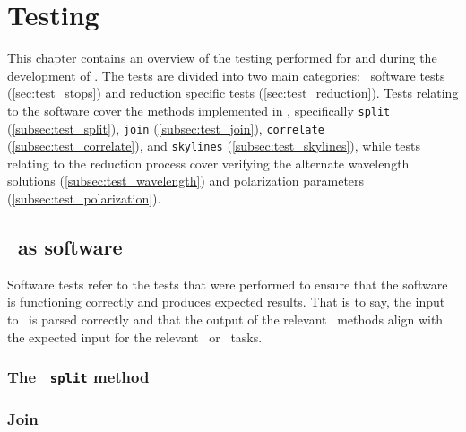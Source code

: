 \chapter{Testing}

This chapter contains an overview of the testing performed for and during the development of \stops. The tests are divided into two main categories: \stops\ software tests (\autoref{sec:test_stops}) and reduction specific tests (\autoref{sec:test_reduction}). Tests relating to the software cover the methods implemented in \stops, specifically \texttt{split} (\autoref{subsec:test_split}), \texttt{join} (\autoref{subsec:test_join}), \texttt{correlate} (\autoref{subsec:test_correlate}), and \texttt{skylines} (\autoref{subsec:test_skylines}), while tests relating to the reduction process cover verifying the alternate wavelength solutions (\autoref{subsec:test_wavelength}) and polarization parameters (\autoref{subsec:test_polarization}).

\section{\stops\ as software} \label{sec:test_stops}

Software tests refer to the tests that were performed to ensure that the software is functioning correctly and produces expected results. That is to say, the input to \stops\ is parsed correctly and that the output of the relevant \stops\ methods align with the expected input for the relevant \iraf\ or \polsalt\ tasks.



\subsection{The \stops\ \texttt{split} method} \label{subsec:test_split}


\subsection{Join} \label{subsec:test_join}


